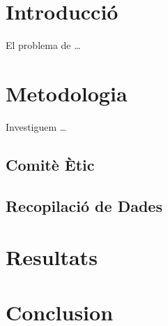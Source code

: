 \documentclass{article}
\begin{document}
\section{Introducció}

El problema de \dots

\section{Metodologia}

Investiguem \dots

\subsection{Comitè Ètic}
\subsection{Recopilació de Dades}

\section{Resultats}

\section{Conclusion}
\end{document}
